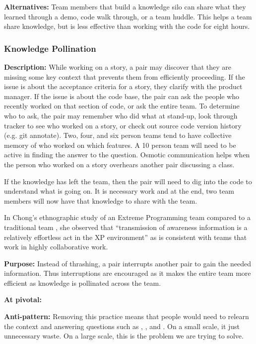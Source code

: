 \begin{table}[]
\textbf{Alternatives:} Team members that build a knowledge silo can share what they learned through a demo, code walk through, or a team huddle. This helps a team share knowledge, but is less effective than working with the code for eight hours. 

\subsubsection{Knowledge Pollination}
\textbf{Description:} While working on a story, a pair may discover that they are missing some key context that prevents them from efficiently proceeding. If the issue is about the acceptance criteria for a story, they clarify with the product manager. If the issue is about the code base, the pair can ask the people who recently worked on that section of code, or ask the entire team.  To determine who to ask, the pair may remember who did what at stand-up, look through tracker to see who worked on a story, or check out source code version history (e.g. git annotate). Two, four, and six  person teams tend to have collective memory of who worked on which features. A 10 person team will need to be active in finding the answer to the question. Osmotic communication helps when the person who worked on a story overhears another pair discussing a class.

If the knowledge has left the team, then the pair will need to dig into the code to understand what is going on. It is necessary work and at the end, two team members will now have that knowledge to share with the team. 

In Chong's ethnographic study of an Extreme Programming team compared to a traditional team \cite{ChongNominum}, she observed that ``transmission of awareness information is a relatively effortless act in the XP environment” as is consistent with teams that work in highly collaborative work. 

\textbf{Purpose:} Instead of thrashing, a pair interrupts another pair to gain the needed information. Thus interruptions are encouraged as it makes the entire team more efficient as knowledge is pollinated across the team. 

\textbf{At pivotal:}


\textbf{Anti-pattern:} Removing this practice means that people would need to relearn the context and answering questions such as , , and . On a small scale, it just unnecessary waste. On a large scale, this is the problem we are trying to solve.


\end{table}
